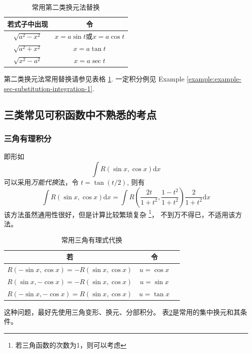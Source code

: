 \begin{table}
    \centering
    \begin{tabular}{cc}
        \toprule
        若式子中出现 & 令 \\
        \midrule
        $\sqrt{a^2 - x^2}$ & $x = a \sin t$或$x = a \cos t$ \\
        $\sqrt{a^2 + x^2}$ & $x = a \tan t$ \\
        $\sqrt{x^2 - a^2}$ & $x = a \sec t$ \\
        \bottomrule
    \end{tabular}
    \caption{常用第二类换元法替换}
    \label{tab:useful-sec-type-substitutions}
\end{table}
第二类换元法常用替换请参见表格 \ref{tab:useful-sec-type-substitutions}.
一定积分例见 Example \ref{example:example-sec-substitution-integration-1}.

\subsection{三类常见可积函数中不熟悉的考点}

\subsubsection{三角有理积分}

即形如
\[
    \int R(\sin x, \cos x) \mbox{d} x 
\]
可以采用\textit{万能代换}法，令 $t = \tan (t/2)$, 则有
\begin{equation}
    \int R(\sin x, \cos x) \mbox{d} x 
    = \int R\left(\dfrac{2t}{1+t^2}, \dfrac{1-t^2}{1+t^2}\right) 
    \dfrac{2}{1+t^2} \mbox{d} x
\end{equation}
该方法虽然通用性很好，但是计算比较繁琐复杂
\footnote{若三角函数的次数为1，则可以考虑}，
不到万不得已，不适用该方法。

\begin{table}
    \centering
    \begin{tabular}{ccc}
        \toprule
        若 & 令 \\
        \midrule
        $R(- \sin x,   \cos x) = -R(\sin x, \cos x)$ & $u = \cos x$ \\
        $R(  \sin x, - \cos x) = -R(\sin x, \cos x)$ & $u = \sin x$ \\
        $R(- \sin x, - \cos x) =  R(\sin x, \cos x)$ & $u = \tan x$ \\
        \bottomrule
    \end{tabular}
    \caption{常用三角有理式代换}
    \label{tab:useful-tri-rational-substitutions}
\end{table}
这种问题，最好先使用三角变形、换元、分部积分。
表\ref{tab:useful-tri-rational-substitutions}是常用的集中换元和其条件。

